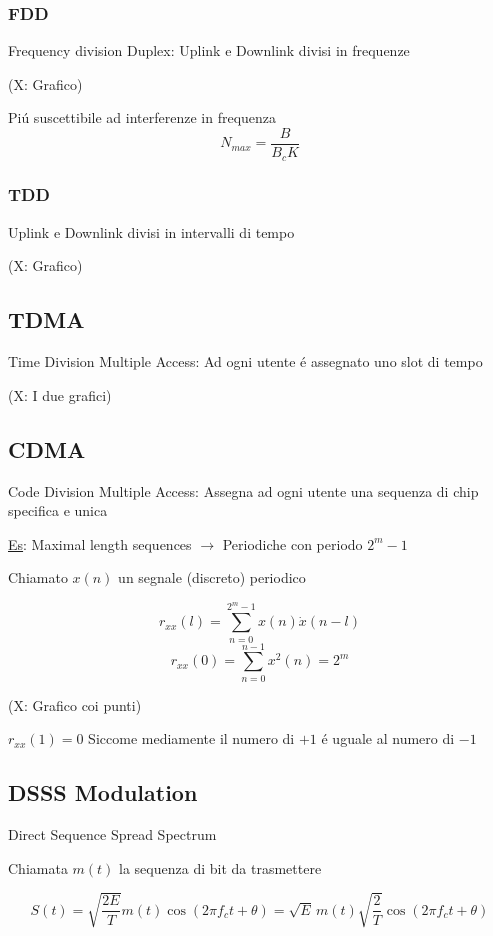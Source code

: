 \documentclass{article}
\begin{document}
\subsubsection{FDD}
Frequency division Duplex: Uplink e Downlink divisi in frequenze

(X: Grafico)

Pi\'u suscettibile ad interferenze in frequenza
\[ N_{\textit{max}} = \frac{B}{B_c K} \]

\subsubsection{TDD}
Uplink e Downlink divisi in intervalli di tempo

(X: Grafico)

\subsection{TDMA}
Time Division Multiple Access: Ad ogni utente \'e assegnato uno slot di tempo

(X: I due grafici)

\subsection{CDMA}
Code Division Multiple Access: Assegna ad ogni utente una sequenza di chip specifica e unica

\underline{Es}: Maximal length sequences $\rightarrow$ Periodiche con periodo $2^m -1$

Chiamato $x(n)$ un segnale (discreto) periodico

\begin{minipage}{0.5\textwidth}
\[ r_{xx}(l) = \sum^{2^m-1}_{n=0}  x(n)\dot x(n -l)\]
\[ r_{xx}(0) = \sum^{n-1}_{n=0} x^2(n) = 2^m \]
\end{minipage}
\begin{minipage}{0.5\textwidth}
    (X: Grafico coi punti)
\end{minipage}

$r_{xx}(1)= 0$ Siccome mediamente il numero di $+1$ \'e uguale al numero di $-1$

\subsection{DSSS Modulation}
Direct Sequence Spread Spectrum

Chiamata $m(t)$ la sequenza di bit da trasmettere

\[S(t) = \sqrt{\frac{2E}{T}} m(t)\cos(2\pi f_c t + \theta) = \sqrt{E}\,m(t)\sqrt{\frac{2}{T}}\cos(2\pi f_c t + \theta)\]
\end{document}
